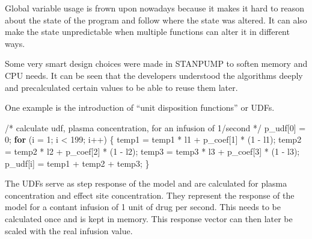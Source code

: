 \documentclass[
  letterpaper,
  DIV=11,
  numbers=noendperiod]{scrartcl}
\newenvironment{Shaded}{\begin{snugshade}}{\end{snugshade}}
\newcommand{\CommentTok}[1]{\textcolor[rgb]{0.37,0.37,0.37}{#1}}
\newcommand{\ControlFlowTok}[1]{\textcolor[rgb]{0.00,0.23,0.31}{\textbf{#1}}}
\newcommand{\DecValTok}[1]{\textcolor[rgb]{0.68,0.00,0.00}{#1}}
\newcommand{\NormalTok}[1]{\textcolor[rgb]{0.00,0.23,0.31}{#1}}
\newcommand{\OperatorTok}[1]{\textcolor[rgb]{0.37,0.37,0.37}{#1}}
\begin{document}
Global variable usage is frown upon nowadays because it makes it hard to
reason about the state of the program and follow where the state was
altered. It can also make the state unpredictable when multiple
functions can alter it in different ways.

Some very smart design choices were made in STANPUMP to soften memory
and CPU needs. It can be seen that the developers understood the
algorithms deeply and precalculated certain values to be able to reuse
them later.

One example is the introduction of ``unit disposition functions'' or
UDFs.

\begin{Shaded}
\begin{Highlighting}[]
\CommentTok{/* calculate udf, plasma concentration, for an infusion of 1/second */}
\NormalTok{p\_udf}\OperatorTok{[}\DecValTok{0}\OperatorTok{]} \OperatorTok{=} \DecValTok{0}\OperatorTok{;}
\ControlFlowTok{for} \OperatorTok{(}\NormalTok{i }\OperatorTok{=} \DecValTok{1}\OperatorTok{;}\NormalTok{  i }\OperatorTok{\textless{}} \DecValTok{199}\OperatorTok{;}\NormalTok{  i}\OperatorTok{++)}
    \OperatorTok{\{}
\NormalTok{    temp1 }\OperatorTok{=}\NormalTok{ temp1 }\OperatorTok{*}\NormalTok{ l1 }\OperatorTok{+}\NormalTok{ p\_coef}\OperatorTok{[}\DecValTok{1}\OperatorTok{]} \OperatorTok{*} \OperatorTok{(}\DecValTok{1} \OperatorTok{{-}}\NormalTok{ l1}\OperatorTok{);}
\NormalTok{    temp2 }\OperatorTok{=}\NormalTok{ temp2 }\OperatorTok{*}\NormalTok{ l2 }\OperatorTok{+}\NormalTok{ p\_coef}\OperatorTok{[}\DecValTok{2}\OperatorTok{]} \OperatorTok{*} \OperatorTok{(}\DecValTok{1} \OperatorTok{{-}}\NormalTok{ l2}\OperatorTok{);}
\NormalTok{    temp3 }\OperatorTok{=}\NormalTok{ temp3 }\OperatorTok{*}\NormalTok{ l3 }\OperatorTok{+}\NormalTok{ p\_coef}\OperatorTok{[}\DecValTok{3}\OperatorTok{]} \OperatorTok{*} \OperatorTok{(}\DecValTok{1} \OperatorTok{{-}}\NormalTok{ l3}\OperatorTok{);}
\NormalTok{    p\_udf}\OperatorTok{[}\NormalTok{i}\OperatorTok{]} \OperatorTok{=}\NormalTok{ temp1 }\OperatorTok{+}\NormalTok{ temp2 }\OperatorTok{+}\NormalTok{ temp3}\OperatorTok{;}
    \OperatorTok{\}}
\end{Highlighting}
\end{Shaded}

The UDFs serve as step response of the model and are calculated for
plasma concentration and effect site concentration. They represent the
response of the model for a contant infusion of 1 unit of drug per
second. This needs to be calculated once and is kept in memory. This
response vector can then later be scaled with the real infusion value.
\end{document}
